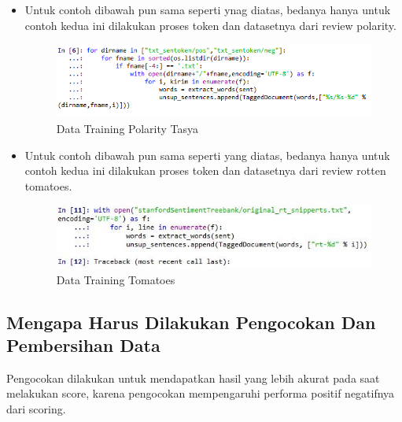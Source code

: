 \begin{itemize}
\item Untuk contoh dibawah pun sama seperti ynag diatas, bedanya hanya untuk contoh kedua ini dilakukan proses token dan datasetnya dari review polarity.
\begin{figure}[ht]
\centering
\includegraphics[scale=0.5]{figures/chapter5tasya21.png}
\caption{Data Training Polarity Tasya}
\label{Praktek}
\end{figure}

\item Untuk contoh dibawah pun sama seperti yang diatas, bedanya hanya untuk contoh kedua ini dilakukan proses token dan datasetnya dari review rotten tomatoes.
\begin{figure}[ht]
\centering
\includegraphics[scale=0.5]{figures/chapter5tasya22.jpg}
\caption{Data Training Tomatoes}
\label{Praktek}
\end{figure}
\end{itemize}

\subsection{Mengapa Harus Dilakukan Pengocokan Dan Pembersihan Data}
Pengocokan dilakukan untuk mendapatkan hasil yang lebih akurat pada saat melakukan score, karena pengocokan mempengaruhi performa positif negatifnya dari scoring.\\

